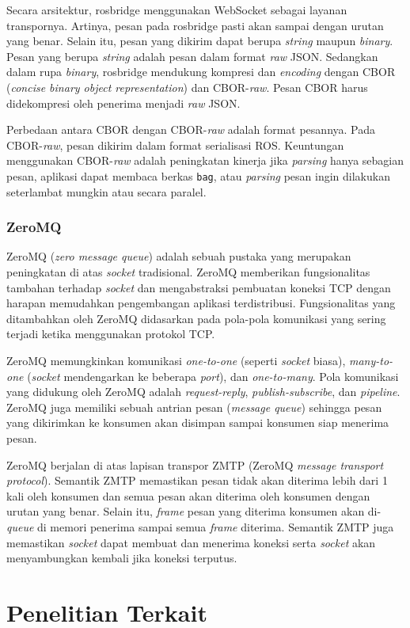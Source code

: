 Secara arsitektur, rosbridge menggunakan WebSocket sebagai layanan
trans\-por\-nya. Artinya, pesan pada rosbridge pasti akan sampai dengan urutan
yang benar. Selain itu, pesan yang dikirim dapat berupa \textit{string} maupun
\textit{binary}. Pesan yang berupa \textit{string} adalah pesan dalam format
\textit{raw} JSON. Sedangkan dalam rupa \textit{binary}, rosbridge mendukung
kompresi dan \textit{encoding} dengan CBOR (\textit{concise binary object
    representation}) dan CBOR-\textit{raw}. Pesan CBOR harus didekompresi oleh
penerima menjadi \textit{raw} JSON.

Perbedaan antara CBOR dengan CBOR-\textit{raw} adalah format pesannya. Pada
CBOR-\textit{raw}, pesan dikirim dalam format serialisasi ROS. Keuntungan
menggunakan C\-B\-O\-R-\textit{raw} adalah peningkatan kinerja jika \textit{parsing}
hanya sebagian pesan, aplikasi dapat membaca berkas \texttt{bag}, atau
\textit{parsing} pesan ingin dilakukan seterlambat mungkin atau secara paralel.

\subsubsection{ZeroMQ}

ZeroMQ (\textit{zero message queue}) adalah sebuah pustaka yang merupakan
pe\-ning\-ka\-tan di atas \textit{socket} tradisional. ZeroMQ memberikan
fungsionalitas tambahan terhadap \textit{socket} dan mengabstraksi pembuatan
koneksi TCP dengan harapan memudahkan pengembangan aplikasi terdistribusi.
Fungsionalitas yang ditambahkan oleh ZeroMQ didasarkan pada pola-pola komunikasi
yang sering terjadi ketika menggunakan protokol TCP.

ZeroMQ memungkinkan komunikasi \textit{one-to-one} (seperti \textit{socket}
biasa), \textit{many-to-one} (\textit{socket} mendengarkan ke beberapa
\textit{port}), dan \textit{one-to-many}. Pola komunikasi yang didukung oleh
ZeroMQ adalah \textit{request-reply}, \textit{publish-subscribe}, dan
\textit{pipeline}. ZeroMQ juga memiliki sebuah antrian pesan (\textit{message
    queue}) sehingga pesan yang dikirimkan ke konsumen akan disimpan
sampai konsumen siap menerima pesan.

ZeroMQ berjalan di atas lapisan transpor ZMTP (ZeroMQ \textit{message transport
    protocol}). Semantik ZMTP memastikan pesan tidak akan diterima lebih dari 1 kali
oleh konsumen dan semua pesan akan diterima oleh konsumen dengan urutan yang
benar. Selain itu, \textit{frame} pesan yang diterima konsumen akan
di-\textit{queue} di memori penerima sampai semua \textit{frame} diterima.
Semantik ZMTP juga memastikan \textit{socket} dapat membuat dan menerima koneksi
serta \textit{socket} akan menyambungkan kembali jika koneksi terputus.

\section{Penelitian Terkait}
\blindtext